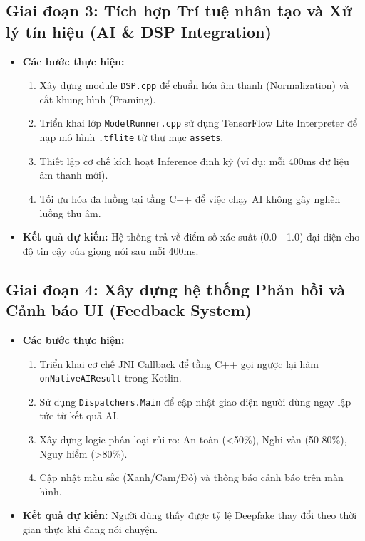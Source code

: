 \documentclass[12pt,a4paper]{article}
\begin{document}
\subsection{Giai đoạn 3: Tích hợp Trí tuệ nhân tạo và Xử lý tín hiệu (AI \& DSP Integration)}
\begin{itemize}
    \item \textbf{Các bước thực hiện:}
    \begin{enumerate}
        \item Xây dựng module \texttt{DSP.cpp} để chuẩn hóa âm thanh (Normalization) và cắt khung hình (Framing).
        \item Triển khai lớp \texttt{ModelRunner.cpp} sử dụng TensorFlow Lite Interpreter để nạp mô hình \texttt{.tflite} từ thư mục \texttt{assets}.
        \item Thiết lập cơ chế kích hoạt Inference định kỳ (ví dụ: mỗi 400ms dữ liệu âm thanh mới).
        \item Tối ưu hóa đa luồng tại tầng C++ để việc chạy AI không gây nghẽn luồng thu âm.
    \end{enumerate}
    \item \textbf{Kết quả dự kiến:} Hệ thống trả về điểm số xác suất (0.0 - 1.0) đại diện cho độ tin cậy của giọng nói sau mỗi 400ms.
\end{itemize}

\subsection{Giai đoạn 4: Xây dựng hệ thống Phản hồi và Cảnh báo UI (Feedback System)}
\begin{itemize}
    \item \textbf{Các bước thực hiện:}
    \begin{enumerate}
        \item Triển khai cơ chế JNI Callback để tầng C++ gọi ngược lại hàm \texttt{onNativeAIResult} trong Kotlin.
        \item Sử dụng \texttt{Dispatchers.Main} để cập nhật giao diện người dùng ngay lập tức từ kết quả AI.
        \item Xây dựng logic phân loại rủi ro: An toàn (<50\%), Nghi vấn (50-80\%), Nguy hiểm (>80\%).
        \item Cập nhật màu sắc (Xanh/Cam/Đỏ) và thông báo cảnh báo trên màn hình.
    \end{enumerate}
    \item \textbf{Kết quả dự kiến:} Người dùng thấy được tỷ lệ Deepfake thay đổi theo thời gian thực khi đang nói chuyện.
\end{itemize}
\end{document}
